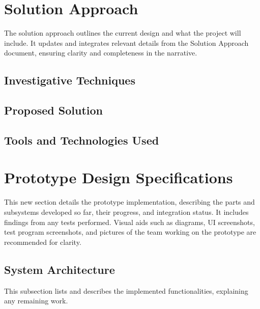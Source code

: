\documentclass{article}
\begin{document}
\section{Solution Approach}

The solution approach outlines the current design and what the project will include. It updates and integrates relevant details from the Solution Approach document, ensuring clarity and completeness in the narrative. 
    
    \subsection{Investigative Techniques}

    \subsection{Proposed Solution}

    \subsection{Tools and Technologies Used}


\newpage


\section{Prototype Design Specifications}

This new section details the prototype implementation, describing the parts and subsystems developed so far, their progress, and integration status. It includes findings from any tests performed. Visual aids such as diagrams, UI screenshots, test program screenshots, and pictures of the team working on the prototype are recommended for clarity. 

    \subsection{System Architecture}
    This subsection lists and describes the implemented functionalities, explaining any remaining work. 
    
\end{document}
